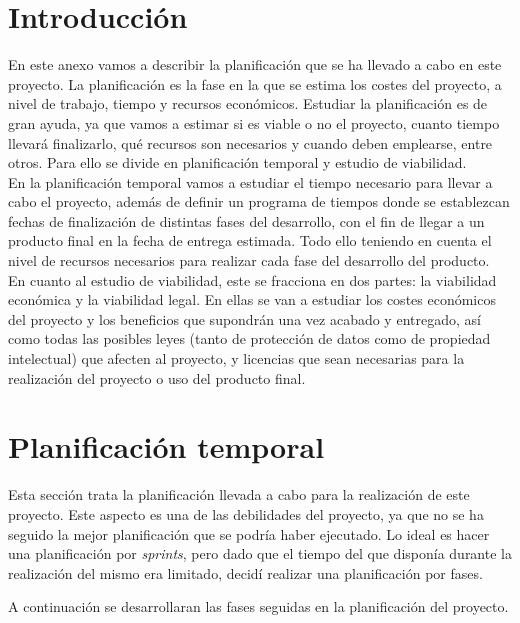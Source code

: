 
\section{Introducción}

En este anexo vamos a describir la planificación que se ha llevado a cabo en este proyecto. 
La planificación es la fase en la que se estima los costes del proyecto, a nivel de trabajo, tiempo y recursos económicos.
Estudiar la planificación es de gran ayuda, ya que vamos a estimar si es viable o no el proyecto, cuanto tiempo llevará finalizarlo, qué recursos son necesarios y cuando deben emplearse, entre otros. 
Para ello se divide en planificación temporal y estudio de viabilidad. \\

En la planificación temporal vamos a estudiar el tiempo necesario para llevar a cabo el proyecto, además de definir un programa de tiempos donde se establezcan fechas de finalización de distintas fases del desarrollo, con el fin de llegar a un producto final en la fecha de entrega estimada. Todo ello teniendo en cuenta el nivel de recursos necesarios para realizar cada fase del desarrollo del producto.\\

En cuanto al estudio de viabilidad, este se fracciona en dos partes: la viabilidad económica y la viabilidad legal. En ellas se van a estudiar los costes económicos del proyecto y los beneficios que supondrán una vez acabado y entregado, así como todas las posibles leyes (tanto de protección de datos como de propiedad intelectual) que afecten al proyecto, y licencias que sean necesarias para la realización del proyecto o uso del producto final.

\section{Planificación temporal}

Esta sección trata la planificación llevada a cabo para la realización de este proyecto.
Este aspecto es una de las debilidades del proyecto, ya que no se ha seguido la mejor planificación que se podría haber ejecutado.
Lo ideal es hacer una planificación por \textit{sprints}, pero dado que el tiempo del que disponía durante la realización del mismo era limitado, decidí realizar una planificación por fases.  

A continuación se desarrollaran las fases seguidas en la planificación del proyecto.

